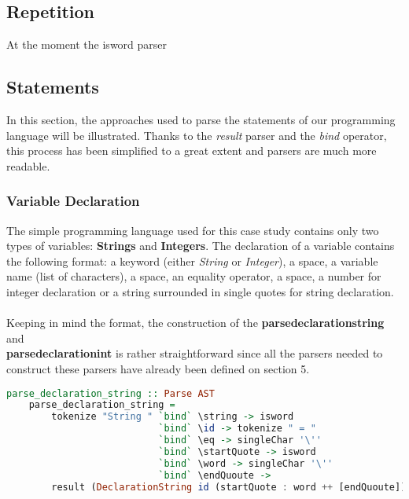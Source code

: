 \documentclass[a4paper, onecolumn]{article}
\begin{document}
    \subsection{Repetition}
    
    At the moment the isword parser
    
    \subsection{Statements}
    
    In this section, the approaches used to parse the statements of our programming language will be illustrated. Thanks to the \textit{result} parser and the \textit{bind} operator, this process has been simplified to a great extent and parsers are much more readable. 
    
    \subsubsection{Variable Declaration}
    
    The simple programming language used for this case study contains only two types of variables: \textbf{Strings} and \textbf{Integers}. The declaration of a variable contains the following format: a keyword (either \textit{String} or \textit{Integer}), a space, a variable name (list of characters), a space, an equality operator, a space, a number for integer declaration or a string surrounded in single quotes for string declaration. \\ \\
    Keeping in mind the format, the construction of the \textbf{parse\textunderscore declaration\textunderscore string} and \\ \textbf{parse\textunderscore declaration\textunderscore int} is rather straightforward since all the parsers needed to construct these parsers have already been defined on section 5.
    
    \begin{tcolorbox}
    \begin{lstlisting}[language=Haskell] 
    parse_declaration_string :: Parse AST
    parse_declaration_string = 
        tokenize "String " `bind` \string -> isword 
                           `bind` \id -> tokenize " = "          
                           `bind` \eq -> singleChar '\''  
                           `bind` \startQuote -> isword 
                           `bind` \word -> singleChar '\''    
                           `bind` \endQuoute -> 
        result (DeclarationString id (startQuote : word ++ [endQuoute])) 
     \end{lstlisting}
    \end{tcolorbox}
    
\end{document}
